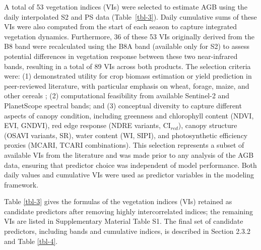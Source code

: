\documentclass[
  english,
  review,
  number,
  sort,compress,
  authoryear,
  3p]{elsarticle}
\begin{document}
A total of 53 vegetation indices (VIs) were selected to estimate AGB
using the daily interpolated S2 and PS data (Table~\ref{tbl-3}). Daily
cumulative sums of these VIs were also computed from the start of each
season to capture integrated vegetation dynamics. Furthermore, 36 of
these 53 VIs originally derived from the B8 band were recalculated using
the B8A band (available only for S2) to assess potential differences in
vegetation response between these two near-infrared bands, resulting in
a total of 89 VIs across both products. The selection criteria were: (1)
demonstrated utility for crop biomass estimation or yield prediction in
peer-reviewed literature, with particular emphasis on wheat, forage,
maize, and other cereals
\citep{Peng2023, Segarra2022, Uribeetxebarria2023, Wang2022, Wu2008, Zheng2017};
(2) computational feasibility from available Sentinel-2 and PlanetScope
spectral bands; and (3) conceptual diversity to capture different
aspects of canopy condition, including greenness and chlorophyll content
(NDVI, EVI, GNDVI), red edge response (NDRE variants, CI\(_{red}\)),
canopy structure (OSAVI variants, SR), water content (WI, SIPI), and
photosynthetic efficiency proxies (MCARI, TCARI combinations). This
selection represents a subset of available VIs from the literature and
was made prior to any analysis of the AGB data, ensuring that predictor
choice was independent of model performance. Both daily values and
cumulative VIs were used as predictor variables in the modeling
framework.

Table \ref{tbl-3} gives the formulas of the vegetation indices (VIs)
retained as candidate predictors after removing highly intercorrelated
indices; the remaining VIs are listed in Supplementary Material Table
S1. The final set of candidate predictors, including bands and
cumulative indices, is described in Section 2.3.2 and Table \ref{tbl-4}.
\end{document}
